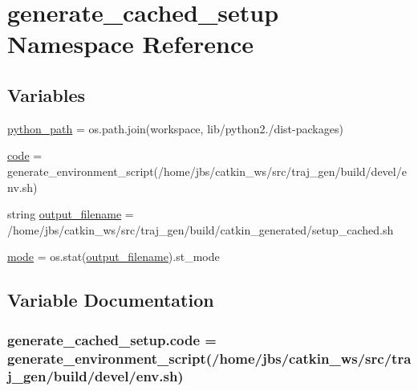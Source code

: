 \hypertarget{namespacegenerate__cached__setup}{}\section{generate\+\_\+cached\+\_\+setup Namespace Reference}
\label{namespacegenerate__cached__setup}
\subsection*{Variables}
\begin{DoxyCompactItemize}
\item 
\hyperlink{namespacegenerate__cached__setup_a72579fd01529a79bab20d99291889d3f}{python\+\_\+path} = os.\+path.\+join(workspace, \textquotesingle{}lib/python2./dist-\/packages\textquotesingle{})
\item 
\hyperlink{namespacegenerate__cached__setup_a52601295006f2366a311c4453d8f2f2e}{code} = generate\+\_\+environment\+\_\+script(\textquotesingle{}/home/jbs/catkin\+\_\+ws/src/traj\+\_\+gen/build/devel/env.\+sh\textquotesingle{})
\item 
string \hyperlink{namespacegenerate__cached__setup_a0265aee5075ee1eb701ff69c98ad6793}{output\+\_\+filename} = \textquotesingle{}/home/jbs/catkin\+\_\+ws/src/traj\+\_\+gen/build/catkin\+\_\+generated/setup\+\_\+cached.\+sh\textquotesingle{}
\item 
\hyperlink{namespacegenerate__cached__setup_a10081e5abedae9bd46dd91202096e789}{mode} = os.\+stat(\hyperlink{namespacegenerate__cached__setup_a0265aee5075ee1eb701ff69c98ad6793}{output\+\_\+filename}).st\+\_\+mode
\end{DoxyCompactItemize}


\subsection{Variable Documentation}
\subsubsection[{\texorpdfstring{code}{code}}]{\setlength{\rightskip}{0pt plus 5cm}generate\+\_\+cached\+\_\+setup.\+code = generate\+\_\+environment\+\_\+script(\textquotesingle{}/home/jbs/catkin\+\_\+ws/src/traj\+\_\+gen/build/devel/env.\+sh\textquotesingle{})}\hypertarget{namespacegenerate__cached__setup_a52601295006f2366a311c4453d8f2f2e}{}\label{namespacegenerate__cached__setup_a52601295006f2366a311c4453d8f2f2e}


